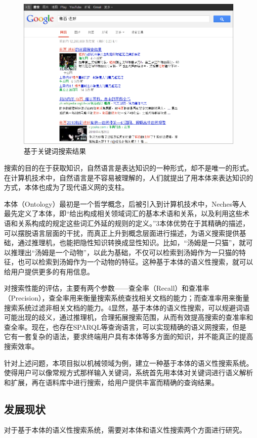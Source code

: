 \documentclass[12pt,a4paper]{article}
\begin{document}
	\begin{figure}[htbp] 
	\centering\includegraphics[width=5in]{queryExample.png} 
	\caption{基于关键词搜索结果}\label{fig:queryExample} 
	\end{figure} 
   
   搜索的目的在于获取知识，自然语言是表达知识的一种形式，却不是唯一的形式。在计算机技术中，自然语言是不容易被理解的，人们就提出了用本体来表达知识的方式，本体也成为了现代语义网的支柱。
   
   本体（Ontology）最初是一个哲学概念，后被引入到计算机技术中，Neches等人最先定义了本体，即“给出构成相关领域词汇的基本术语和关系，以及利用这些术语和关系构成的规定这些词汇外延的规则的定义。”3本体优势在于其精确的描述，可以摆脱语言层面的干扰，而真正上升到概念层面进行描述，为语义搜索提供基础，通过推理机，也能把隐性知识转换成显性知识。比如，“汤姆是一只猫”，就可以推理出“汤姆是一个动物”，以此为基础，不仅可以检索到汤姆作为一只猫的特征，也可以检索到汤姆作为一个动物的特征。这种基于本体的语义性搜索，就可以给用户提供更多的有用信息。
   
	对搜索性能的评估，主要有两个参数——查全率（Recall）和查准率（Precision），查全率用来衡量搜索系统查找相关文档的能力；而查准率用来衡量搜索系统过滤非相关文档的能力。4显然，基于本体的语义性搜索，可以规避词语可能出现的歧义，通过推理机，合理拓展搜索范围，从而有效提高搜索的查准率和查全率。现在，也存在SPARQL等查询语言，可以实现精确的语义网搜索，但是它有一套复杂的语法，要求终端用户具有本体等多方面的知识，并不能真正的提高搜索效率。

	针对上述问题，本项目拟以机械领域为例，建立一种基于本体的语义性搜索系统。使得用户可以像常规方式那样输入关键词，系统首先用本体对关键词进行语义解析和扩展，再在语料库中进行搜索，给用户提供丰富而精确的查询结果。
	\subsection{发展现状}
	对于基于本体的语义性搜索系统，需要对本体和语义性搜索两个方面进行研究。
\end{document}
